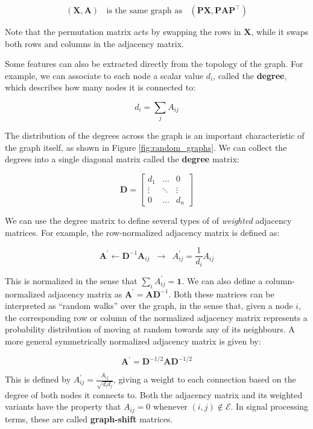 $$
(\mathbf{X}, \mathbf{A}) \;\; \text{ is the same graph as } \;\;(\mathbf{P}\mathbf{X},\mathbf{P}\mathbf{A}\mathbf{P}^\top)
$$

Note that the permutation matrix acts by swapping the rows in $\mathbf{X}$, while it swaps both rows and columns in the adjacency matrix.

Some features can also be extracted directly from the topology of the graph. For example, we can associate to each node a scalar value $d_i$, called the \textbf{degree}, which describes how many nodes it is connected to:

$$
d_i=\sum_j A_{ij}
$$

The distribution of the degrees across the graph is an important characteristic of the graph itself, as shown in Figure \ref{fig:random_graphs}. We can collect the degrees into a single diagonal matrix called the \textbf{degree} matrix:

$$
\mathbf{D} =\begin{bmatrix} d_1 & \ldots & 0 \\ \vdots &\ddots & \vdots \\0 & \ldots & d_n \end{bmatrix}
$$

We can use the degree matrix to define several types of of \textit{weighted} adjacency matrices. For example, the row-normalized adjacency matrix is defined as:

$$
\mathbf{A}^\prime \leftarrow \mathbf{D}^{-1}\mathbf{A}_{ij} \;\; \rightarrow\;\; A^\prime_{ij} = \frac{1}{d_i}A_{ij}
$$



This is normalized in the sense that $\sum_i A^\prime_{ij} = \mathbf{1}$. We can also define a column-normalized adjacency matrix as $\mathbf{A}^\prime = \mathbf{A}\mathbf{D}^{-1}$. Both these matrices can be interpreted as “random walks” over the graph, in the sense that, given a node $i$, the corresponding row or column of the normalized adjacency matrix represents a probability distribution of moving at random towards any of its neighbours. A more general symmetrically normalized adjacency matrix is given by:

$$
\mathbf{A}^\prime=\mathbf{D}^{-1/2}\mathbf{A}\mathbf{D}^{-1/2}
$$

This is defined by $A^\prime_{ij} = \frac{A_{ij}}{\sqrt{d_i d_j}}$, giving a weight to each connection based on the degree of both nodes it connects to. Both the adjacency matrix and its weighted variants have the property that $A_{ij} = 0$ whenever $(i,j) \notin \mathcal{E}$. In signal processing terms, these are called \textbf{graph-shift} matrices.

